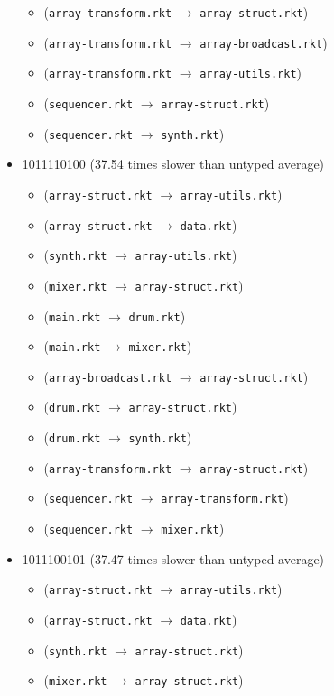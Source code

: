 \documentclass{article}
\newcommand{\mono}[1]{\texttt{#1}}
\begin{document}
\begin{itemize}
\begin{itemize}
  \item (\mono{array-transform.rkt} $\rightarrow$ \mono{array-struct.rkt})
  \item (\mono{array-transform.rkt} $\rightarrow$ \mono{array-broadcast.rkt})
  \item (\mono{array-transform.rkt} $\rightarrow$ \mono{array-utils.rkt})
  \item (\mono{sequencer.rkt} $\rightarrow$ \mono{array-struct.rkt})
  \item (\mono{sequencer.rkt} $\rightarrow$ \mono{synth.rkt})
  \end{itemize}
\item 1011110100 (37.54 times slower than untyped average)
  \begin{itemize}
  \item (\mono{array-struct.rkt} $\rightarrow$ \mono{array-utils.rkt})
  \item (\mono{array-struct.rkt} $\rightarrow$ \mono{data.rkt})
  \item (\mono{synth.rkt} $\rightarrow$ \mono{array-utils.rkt})
  \item (\mono{mixer.rkt} $\rightarrow$ \mono{array-struct.rkt})
  \item (\mono{main.rkt} $\rightarrow$ \mono{drum.rkt})
  \item (\mono{main.rkt} $\rightarrow$ \mono{mixer.rkt})
  \item (\mono{array-broadcast.rkt} $\rightarrow$ \mono{array-struct.rkt})
  \item (\mono{drum.rkt} $\rightarrow$ \mono{array-struct.rkt})
  \item (\mono{drum.rkt} $\rightarrow$ \mono{synth.rkt})
  \item (\mono{array-transform.rkt} $\rightarrow$ \mono{array-struct.rkt})
  \item (\mono{sequencer.rkt} $\rightarrow$ \mono{array-transform.rkt})
  \item (\mono{sequencer.rkt} $\rightarrow$ \mono{mixer.rkt})
  \end{itemize}
\item 1011100101 (37.47 times slower than untyped average)
  \begin{itemize}
  \item (\mono{array-struct.rkt} $\rightarrow$ \mono{array-utils.rkt})
  \item (\mono{array-struct.rkt} $\rightarrow$ \mono{data.rkt})
  \item (\mono{synth.rkt} $\rightarrow$ \mono{array-struct.rkt})
  \item (\mono{mixer.rkt} $\rightarrow$ \mono{array-struct.rkt})

\end{itemize}
\end{itemize}
\end{document}
